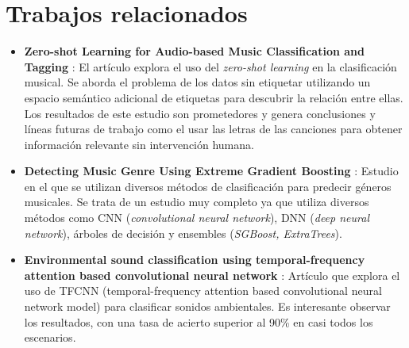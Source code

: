 
\section{Trabajos relacionados}

\begin{itemize}
\tightlist

\item \textbf{Zero-shot Learning for Audio-based Music Classification and Tagging} \cite{choi2020zeroshot}: El artículo explora el uso del \textit{zero-shot learning} en la clasificación musical. 
Se aborda el problema de los datos sin etiquetar utilizando un espacio semántico adicional de etiquetas para descubrir la relación entre ellas. 
Los resultados de este estudio son prometedores y genera conclusiones y líneas futuras de trabajo como el usar las letras de las canciones para obtener información relevante sin intervención humana.

\item \textbf{Detecting Music Genre Using Extreme Gradient Boosting} \cite{10.1145/3184558.3191822}: Estudio en el que se utilizan diversos métodos de clasificación para predecir géneros musicales. Se trata de un estudio muy completo ya
que utiliza diversos métodos como CNN (\textit{convolutional neural network}), DNN (\textit{deep neural network}), árboles de decisión y ensembles (\textit{SGBoost, ExtraTrees}).

\item \textbf{Environmental sound classification using temporal-frequency attention based convolutional neural network} \cite{Mu_Yin_Huang_Xu_Du_2021}: Artículo que explora el uso de TFCNN (temporal-frequency attention based convolutional neural network model)
para clasificar sonidos ambientales. Es interesante observar los resultados, con una tasa de acierto superior al 90\% en casi todos los escenarios.
\end{itemize}
